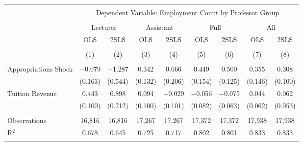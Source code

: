 
\begin{tabular}{@{\extracolsep{5pt}}lcccccccc} 
\\[-1.8ex]\hline 
\hline \\[-1.8ex] 
 & \multicolumn{8}{c}{Dependent Variable: Employment Count by Professor Group} \\ 
\cline{2-9} 
\\[-1.8ex] & \multicolumn{2}{c}{Lecturer} & \multicolumn{2}{c}{Assistant} & \multicolumn{2}{c}{Full} & \multicolumn{2}{c}{All} \\ 
 & OLS & 2SLS & OLS & 2SLS & OLS & 2SLS & OLS & 2SLS \\ 
\\[-1.8ex] & (1) & (2) & (3) & (4) & (5) & (6) & (7) & (8)\\ 
\hline \\[-1.8ex] 
 Appropriations Shock & $-$0.079 & $-$1.287 & 0.342 & 0.666 & 0.449 & 0.500 & 0.355 & 0.308 \\ 
  & (0.163) & (0.544) & (0.132) & (0.206) & (0.154) & (0.125) & (0.146) & (0.100) \\ 
  Tuition Revenue & 0.443 & 0.898 & 0.094 & $-$0.029 & $-$0.056 & $-$0.075 & 0.044 & 0.062 \\ 
  & (0.100) & (0.212) & (0.100) & (0.101) & (0.082) & (0.063) & (0.062) & (0.053) \\ 
 \hline \\[-1.8ex] 
Observations & 16,816 & 16,816 & 17,267 & 17,267 & 17,372 & 17,372 & 17,938 & 17,938 \\ 
R$^{2}$ & 0.678 & 0.645 & 0.725 & 0.717 & 0.802 & 0.801 & 0.833 & 0.833 \\ 
\hline 
\hline \\[-1.8ex] 
\end{tabular} 
